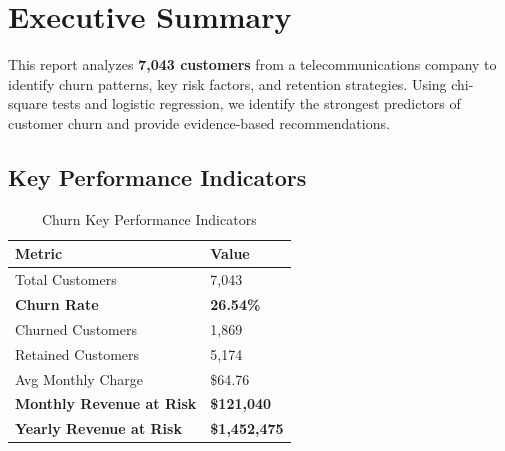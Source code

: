 \documentclass[11pt,a4paper]{article}
\begin{document}
\begin{titlepage}
\begin{center}
        \vfill
        
        \begin{center}
        \end{center}
    \end{center}
\end{titlepage}

\newpage
\renewcommand{\contentsname}{\color{primary}\Large\bfseries Table of Contents}
\tableofcontents
\newpage

\section{Executive Summary}

\begin{tcolorbox}[
    colback=accent!5,
    colframe=accent!40,
    arc=8pt,
    left=15pt,
    right=15pt,
    top=12pt,
    bottom=12pt
]
This report analyzes \textbf{7,043 customers} from a telecommunications company to identify churn patterns, key risk factors, and retention strategies. Using chi-square tests and logistic regression, we identify the strongest predictors of customer churn and provide evidence-based recommendations.
\end{tcolorbox}

\vspace{12pt}

\subsection{Key Performance Indicators}

\begin{table}[H]
\centering
\begin{tabular}{p{5cm} p{5cm}}
\toprule
\rowcolor{primary!10}
\textbf{Metric} & \textbf{Value} \\
\midrule
Total Customers & 7,043 \\
\textbf{Churn Rate} & \textbf{26.54\%} \\
Churned Customers & 1,869 \\
Retained Customers & 5,174 \\
Avg Monthly Charge & \$64.76 \\
\textbf{Monthly Revenue at Risk} & \textbf{\$121,040} \\
\textbf{Yearly Revenue at Risk} & \textbf{\$1,452,475} \\
\bottomrule
\end{tabular}
\caption{Churn Key Performance Indicators}
\end{table}
\end{document}
